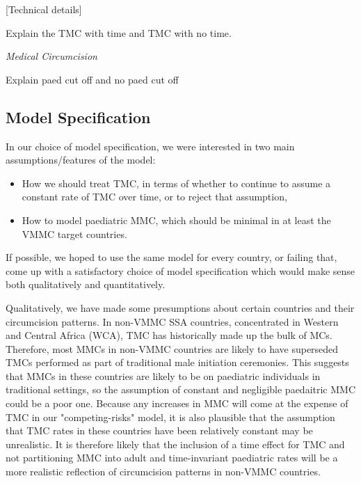 \documentclass[a4paper, 12pt]{article}
\begin{document}
[Technical details] 

Explain the TMC with time and TMC with no time.  

\emph{Medical Circumcision}

Explain paed cut off and no paed cut off 

\subsection{Model Specification}
\label{sec:org40f2f33}

In our choice of model specification, we were interested in two main assumptions/features of the
model:
\begin{itemize}
\item How we should treat TMC, in terms of whether to continue to assume a constant rate of TMC over time, or to reject that assumption,
\item How to model paediatric MMC, which should be minimal in at least the VMMC target countries.
\end{itemize}

If possible, we hoped to use the same model for every country, or failing that, come up with a
satisfactory choice of model specification which would make sense both qualitatively and
quantitatively. 

Qualitatively, we have made some presumptions about certain countries and their circumcision patterns.
In non-VMMC SSA countries, concentrated in Western and Central Africa (WCA), TMC has historically made up the bulk of MCs.
Therefore, most MMCs in non-VMMC countries are likely to have superseded TMCs performed as part of traditional male initiation ceremonies. This suggests that MMCs in these countries are likely to be on paediatric individuals in traditional settings, so the assumption of constant and
negligible paedaitric MMC could be a poor one. 
Because any increases in MMC will come at the expense of TMC in our "competing-risks" model, it is also plausible that the assumption that TMC rates in these countries have been relatively constant may be unrealistic.
It is therefore likely that the inclusion of a time effect for TMC and not partitioning MMC into adult and time-invariant paediatric rates will be a more realistic reflection of circumcision
patterns in non-VMMC countries.  
\end{document}
